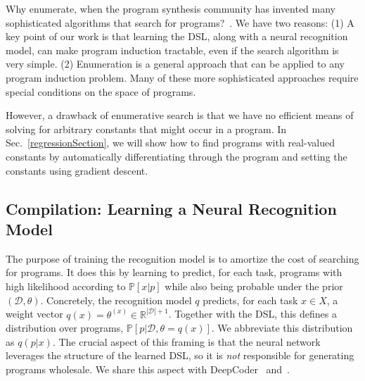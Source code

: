 \documentclass{article}
\newcommand{\probability}{\mathds{P}} %
\begin{document}
Why enumerate, when the program synthesis community has invented many
sophisticated algorithms that search for programs?~\cite{solar2008program,schkufza2013stochastic,feser2015synthesizing,osera2015type,polozov2015flashmeta}.
We have two reasons:
(1) A key point of our work is that learning the DSL, along with a neural recognition model, can make program induction tractable, even if the search algorithm is very simple.
(2) Enumeration is a general approach that can be applied to any program induction problem. Many of these more sophisticated approaches require special conditions on
  the space of  programs.

  However, a drawback of   enumerative search  is that we have no
efficient means of solving for arbitrary constants that might occur in a
program. In Sec.~\ref{regressionSection},
we will show how to find programs with real-valued constants
by automatically differentiating through the program and setting the constants using gradient descent.







\subsection{Compilation: Learning a Neural Recognition Model}\label{recognitionSection}

The purpose of training the recognition model is to amortize the cost of searching for
programs.  It does this by learning to predict, for each task,
programs with high likelihood according to 
$\probability[x|p]$ while also being
probable under the prior $(\mathcal{D},\theta)$.  Concretely,
the recognition model $q$ predicts, for each
task $x\in X$, a weight vector $q(x) = \theta^{(x)}\in
\mathbb{R}^{|\mathcal{D}| + 1}$.  Together with the DSL, this defines
a distribution over programs, $\probability[p|\mathcal{D},\theta =
  q(x)]$.  We abbreviate this distribution as $q(p|x)$.  The crucial
aspect of this framing is that the neural network leverages the
structure of the learned DSL, so it is \emph{not} responsible for
generating programs wholesale.  We share this aspect with
DeepCoder~\cite{balog2016deepcoder} and~\cite{menon2013machine}.
\end{document}
